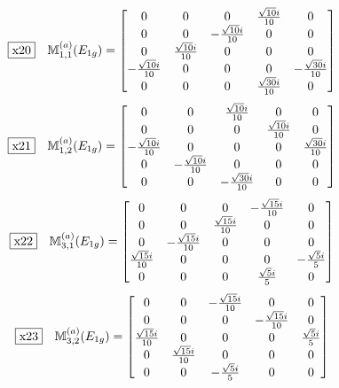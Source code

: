 \documentclass[fleqn,10pt,landscape]{jsarticle}
\begin{document}
\begin{dmath*}
\fbox{x20}\quad \mathbb{M}_{1,1}^{(a)}(E_{1g})=\begin{bmatrix} 0 & 0 & 0 & \frac{\sqrt{10} i}{10} & 0 \\ 0 & 0 & - \frac{\sqrt{10} i}{10} & 0 & 0 \\ 0 & \frac{\sqrt{10} i}{10} & 0 & 0 & 0 \\ - \frac{\sqrt{10} i}{10} & 0 & 0 & 0 & - \frac{\sqrt{30} i}{10} \\ 0 & 0 & 0 & \frac{\sqrt{30} i}{10} & 0 \end{bmatrix}
\end{dmath*}
\begin{dmath*}
\fbox{x21}\quad \mathbb{M}_{1,2}^{(a)}(E_{1g})=\begin{bmatrix} 0 & 0 & \frac{\sqrt{10} i}{10} & 0 & 0 \\ 0 & 0 & 0 & \frac{\sqrt{10} i}{10} & 0 \\ - \frac{\sqrt{10} i}{10} & 0 & 0 & 0 & \frac{\sqrt{30} i}{10} \\ 0 & - \frac{\sqrt{10} i}{10} & 0 & 0 & 0 \\ 0 & 0 & - \frac{\sqrt{30} i}{10} & 0 & 0 \end{bmatrix}
\end{dmath*}
\begin{dmath*}
\fbox{x22}\quad \mathbb{M}_{3,1}^{(a)}(E_{1g})=\begin{bmatrix} 0 & 0 & 0 & - \frac{\sqrt{15} i}{10} & 0 \\ 0 & 0 & \frac{\sqrt{15} i}{10} & 0 & 0 \\ 0 & - \frac{\sqrt{15} i}{10} & 0 & 0 & 0 \\ \frac{\sqrt{15} i}{10} & 0 & 0 & 0 & - \frac{\sqrt{5} i}{5} \\ 0 & 0 & 0 & \frac{\sqrt{5} i}{5} & 0 \end{bmatrix}
\end{dmath*}
\begin{dmath*}
\fbox{x23}\quad \mathbb{M}_{3,2}^{(a)}(E_{1g})=\begin{bmatrix} 0 & 0 & - \frac{\sqrt{15} i}{10} & 0 & 0 \\ 0 & 0 & 0 & - \frac{\sqrt{15} i}{10} & 0 \\ \frac{\sqrt{15} i}{10} & 0 & 0 & 0 & \frac{\sqrt{5} i}{5} \\ 0 & \frac{\sqrt{15} i}{10} & 0 & 0 & 0 \\ 0 & 0 & - \frac{\sqrt{5} i}{5} & 0 & 0 \end{bmatrix}
\end{dmath*}
\end{document}
